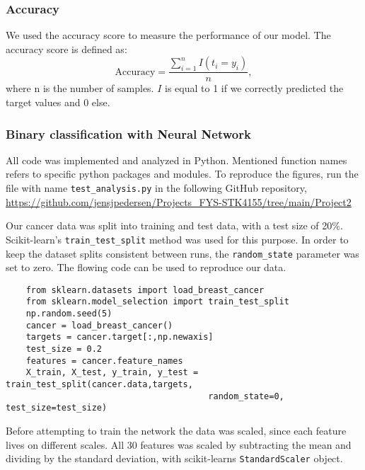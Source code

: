 
\subsubsection{Accuracy}
We used the accuracy score to measure the performance of our model. The
accuracy score is defined as: 
\begin{equation*}
    \text{Accuracy} = \frac{\sum_{i=1}^{n} I(t_i = y_i)}{n}, 
\end{equation*}
where n is the number of samples. $I$ is equal to 1 if we correctly predicted
the target values and 0 else.  



\subsubsection{Binary classification with Neural Network}
\label{sec:nn_classification} 

All code was implemented and analyzed in Python. Mentioned function names refers to
specific python packages and modules. To reproduce the figures, run the file
with name \verb|test_analysis.py| in the following GitHub repository, \url{https://github.com/jensjpedersen/Projects_FYS-STK4155/tree/main/Project2}

Our cancer data was split into training and test data, with a test size of
20\%. 
Scikit-learn's \verb|train_test_split| method was used for this purpose. In
order to keep the dataset splits consistent between runs, the
\verb|random_state| parameter was set to zero. The flowing code can be used to
reproduce our data. 
\begin{verbatim}
    from sklearn.datasets import load_breast_cancer
    from sklearn.model_selection import train_test_split 
    np.random.seed(5)
    cancer = load_breast_cancer()
    targets = cancer.target[:,np.newaxis]
    test_size = 0.2
    features = cancer.feature_names
    X_train, X_test, y_train, y_test = train_test_split(cancer.data,targets,
                                        random_state=0, test_size=test_size)
\end{verbatim}





Before attempting to train the network the data was scaled, since each
feature lives on different scales. All 30 features was scaled by subtracting
the mean and dividing by the standard deviation, with scikit-learns
\verb|StandardScaler| object. 


